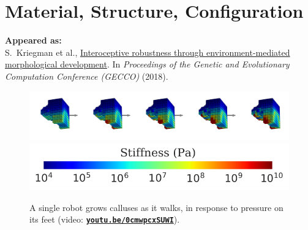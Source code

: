 

\chapter{Material, Structure, Configuration}

\textbf{Appeared as:}\\
S.~Kriegman et al., 
\href{https://arxiv.org/abs/1804.02257}{\color{blue}Interoceptive robustness through environment-mediated morphological development}. In
\textit{Proceedings of the Genetic and Evolutionary Computation Conference (GECCO)} (2018).



\begin{figure}[!h]
    \centering
    \includegraphics[width=\linewidth]{Chapter06/img/Callosities} \\
    \vspace{-0.5em}
    \includegraphics[width=0.35\linewidth]{Chapter06/img/colorbar} \\
    \caption{A single robot grows calluses as it walks, 
    in response to pressure on its feet   
    (video: \href{https://youtu.be/0cmwpcxSUWI}{\color{blue}\textbf{\texttt{youtu.be/0cmwpcxSUWI}}}).
    } %
    \label{fig6:calluses}
\end{figure}

